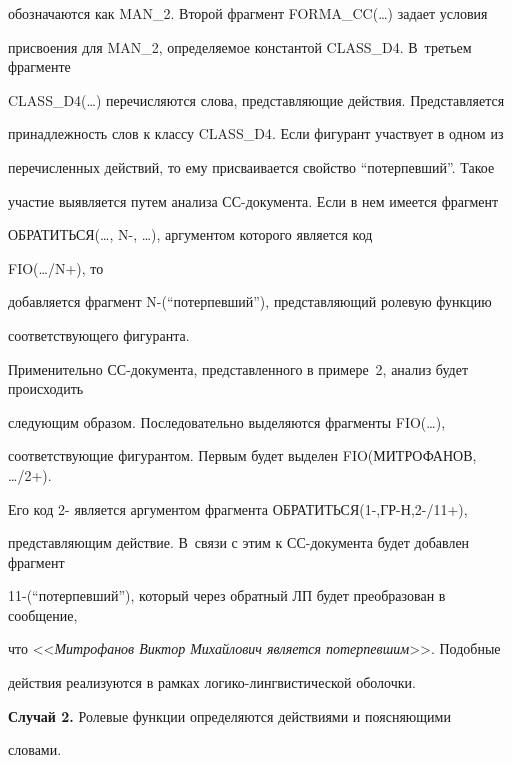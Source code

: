 обозначаются как  MAN\_2. Второй фрагмент {\sf FORMA\_CC(\ldots)} задает условия 


присвоения для MAN\_2, определяемое константой {\sf CLASS\_D4}. В~третьем фрагменте 


{\sf CLASS\_D4(\ldots)} перечисляются слова, представляющие действия. Представляется 


принадлежность слов к классу {\sf CLASS\_D4}. Если фигурант участвует в одном из 


перечисленных действий, то ему присваивается свойство ``потерпевший''. Такое 


участие выявляется путем анализа СС-документа. Если в нем имеется фрагмент  


{\sf ОБРАТИТЬСЯ(\ldots, N-, \ldots)}, аргументом которого является код 


{\sf FIO(\ldots/N+)}, то 


добавляется фрагмент {\sf N-(``потерпевший'')}, представ\-ля\-ющий ролевую функцию 


соответствующего фигуранта. 





Применительно СС-документа, представленного в примере~2, анализ будет происходить 


следующим образом. Последовательно выделяются фрагменты {\sf FIO(\ldots)}, 


соответствующие фигурантом. Первым будет выделен {\sf FIO(МИТРОФАНОВ, \ldots/2+)}. 


Его код 2- является аргументом фрагмента {\sf ОБРАТИТЬСЯ(1-,ГР-Н,2-/11+)}, 


представляющим действие. В~связи с этим к СС-документа будет добавлен фрагмент 


11-(``потерпевший''), который через обратный ЛП будет преобразован в сообщение, 


что <<\textit{Митрофанов Виктор Михайлович является потерпевшим}>>. Подобные 


действия реализуются в рамках логико-лингвистической оболочки.


    


\medskip





\noindent


\textbf{Случай 2.} Ролевые функции определяются действиями и поясняющими 


словами.





